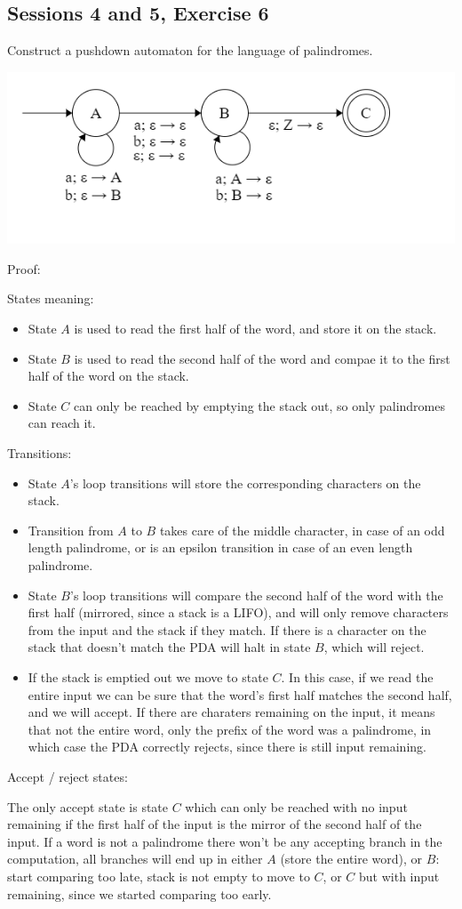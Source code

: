 \subsection{Sessions 4 and 5, Exercise 6}
\label{4f6}


Construct a pushdown automaton for the language of palindromes.


\includegraphics[width=0.5\linewidth]{04/4_6.png}

Proof:

States meaning:
\begin{itemize}
    \item State $A$ is used to read the first half of the word, and store it on the stack.
    \item State $B$ is used to read the second half of the word and compae it to the first half of the word on the stack.
    \item State $C$ can only be reached by emptying the stack out, so only palindromes can reach it.
\end{itemize}

Transitions:

\begin{itemize}
    \item State $A$'s loop transitions will store the corresponding characters on the stack.
    \item Transition from $A$ to $B$ takes care of the middle character, in case of an odd length palindrome, or is an epsilon transition in case of an even length palindrome.
    \item State $B$'s loop transitions will compare the second half of the word with the first half (mirrored, since a stack is a LIFO), and will only remove characters from the input and the stack if they match. If there is a character on the stack that doesn't match the PDA will halt in state $B$, which will reject.
    \item If the stack is emptied out we move to state $C$. In this case, if we read the entire input we can be sure that the word's first half matches the second half, and we will accept. If there are charaters remaining on the input, it means that not the entire word, only the prefix of the word was a palindrome, in which case the PDA correctly rejects, since there is still input remaining.
\end{itemize}

Accept / reject states:

The only accept state is state $C$ which can only be reached with no input remaining if the first half of the input is the mirror of the second half of the input. If a word is not a palindrome there won't be any accepting branch in the computation, all branches will end up in either $A$ (store the entire word), or $B$: start comparing too late, stack is not empty to move to $C$, or $C$ but with input remaining, since we started comparing too early.